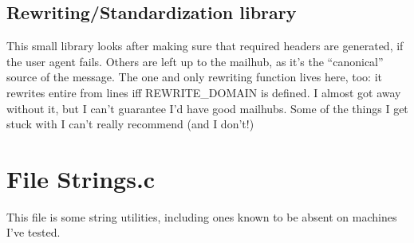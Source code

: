 \subsection{Rewriting/Standardization library}
	This small library looks after making sure that required
headers are generated, if the user agent fails.  Others are 
left up to the mailhub, as it's the ``canonical'' source of the
message.
	The one and only rewriting function lives here, too:
it rewrites entire from lines iff REWRITE\<_DOMAIN is defined.
I almost got away without it, but I can't guarantee I'd have
good mailhubs.  Some of the things I get stuck with I can't
really recommend (and I don't!)

\section{File Strings.c}
  This file is some string utilities, including ones known
to be absent on machines I've tested.


%
